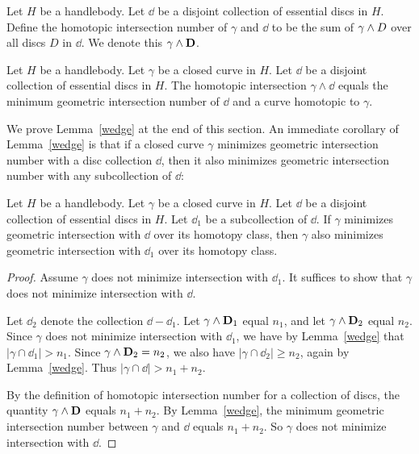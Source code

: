 Let $H$ be a handlebody.  Let $\dd$ be a disjoint collection of essential discs in $H$.  Define the homotopic intersection number of $\gamma$ and $\dd$ to be the sum of $\gamma\wedge D$ over all discs $D$ in $\dd$.   We denote this $\gamma\wedge\mathbf{D}$.

\begin{lemma}
\label{wedge}
Let $H$ be a handlebody.  Let $\gamma$ be a closed curve in $H$.  Let $\dd$ be a disjoint collection of essential discs in $H$.  The homotopic intersection $\gamma\wedge\dd$ equals the minimum geometric intersection number of $\dd$ and a curve homotopic to $\gamma$.
\end{lemma}

We prove Lemma~\ref{wedge} at the end of this section.  An immediate corollary of Lemma~\ref{wedge} is that if a closed curve $\gamma$ minimizes geometric intersection number with a disc collection $\dd$, then it also minimizes geometric intersection number with any subcollection of $\dd$:

\begin{corollary}
\label{subcollection}
Let $H$ be a handlebody.  Let $\gamma$ be a closed curve in $H$.  Let $\dd$ be a disjoint collection of essential discs in $H$.  Let $\dd_{1}$ be a subcollection of $\dd$.  If $\gamma$ minimizes geometric intersection with $\dd$ over its homotopy class, then $\gamma$ also minimizes geometric intersection with $\dd_{1}$ over its homotopy class.
\end{corollary}

\begin{proof}
Assume $\gamma$ does not minimize intersection with $\dd_{1}$.  It suffices to show that $\gamma$ does not minimize intersection with $\dd$.

Let $\dd_{2}$ denote the collection $\dd-\dd_{1}$.  Let $\gamma\wedge\mathbf{D}_{1}$ equal $n_{1}$, and let $\gamma\wedge\mathbf{D}_{2}$ equal $n_{2}$.  Since $\gamma$ does not minimize intersection with $\dd_{1}$, we have by Lemma~\ref{wedge} that $|\gamma\cap\dd_{1}|>n_{1}$.  Since $\gamma\wedge\mathbf{D}_{2}=n_{2}$, we also have $|\gamma\cap\dd_{2}|\geq n_{2}$, again by Lemma~\ref{wedge}.  Thus $|\gamma\cap\dd|>n_{1}+n_{2}$.

By the definition of homotopic intersection number for a collection of discs, the quantity $\gamma\wedge\mathbf{D}$ equals $n_{1}+n_{2}$.  By Lemma~\ref{wedge}, the minimum geometric intersection number between $\gamma$ and $\dd$ equals $n_{1}+n_{2}$.  So $\gamma$ does not minimize intersection with $\dd$.
\end{proof}

